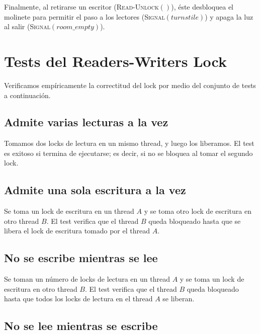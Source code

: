 \documentclass[a4paper,10pt,twoside]{article}
\newcommand{\Fn}[2]{\textsc{#1}$(#2)$}
\begin{document}
Finalmente, al retirarse un escritor (\Fn{Read-Unlock}{}), éste desbloquea el molinete para permitir el paso a los lectores (\Fn{Signal}{turnstile}) y apaga la luz al salir (\Fn{Signal}{room\_empty}). 




\section{Tests del Readers-Writers Lock}

Verificamos empíricamente la correctitud del lock por medio del conjunto de tests a continuación.


\subsection{Admite varias lecturas a la vez}

Tomamos dos locks de lectura en un mismo thread, y luego los liberamos. El test es exitoso si termina de ejecutarse; es decir, si no se bloquea al tomar el segundo lock.


\subsection{Admite una sola escritura a la vez}

Se toma un lock de escritura en un thread $A$ y se toma otro lock de escritura en otro thread $B$. El test verifica que el thread $B$ queda bloqueado hasta que se libera el lock de escritura tomado por el thread $A$.


\subsection{No se escribe mientras se lee}

Se toman un número de locks de lectura en un thread $A$ y se toma un lock de escritura en otro thread $B$. El test verifica que el thread $B$ queda bloqueado hasta que todos los locks de lectura en el thread $A$ se liberan.


\subsection{No se lee mientras se escribe}
\end{document}
